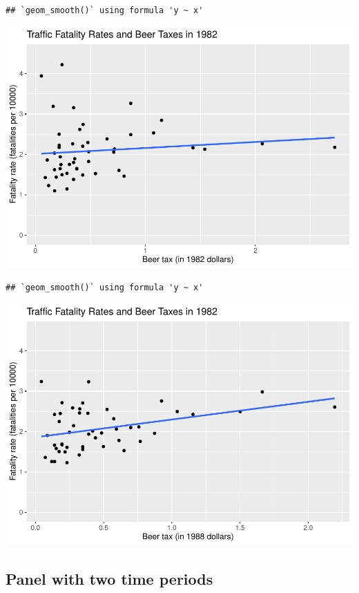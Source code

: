 \documentclass[
]{article}
\begin{document}
\begin{verbatim}
## `geom_smooth()` using formula 'y ~ x'
\end{verbatim}

\includegraphics{Panel_data_files/figure-latex/unnamed-chunk-2-1.pdf}

\begin{verbatim}
## `geom_smooth()` using formula 'y ~ x'
\end{verbatim}

\includegraphics{Panel_data_files/figure-latex/unnamed-chunk-2-2.pdf}

\hypertarget{panel-with-two-time-periods}{%
\subsection{Panel with two time
periods}\label{panel-with-two-time-periods}}
\end{document}
